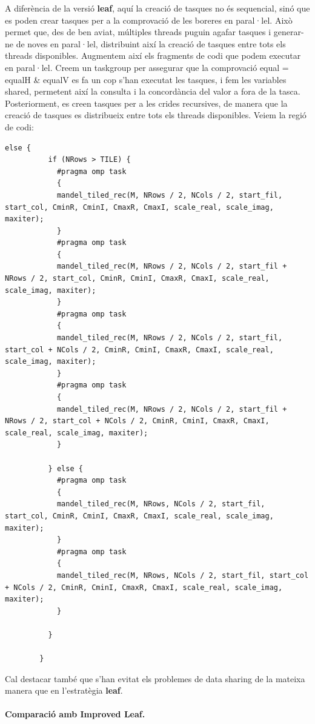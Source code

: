 A diferència de la versió \textbf{leaf}, aquí la creació de tasques no és sequencial, sinó que es poden crear tasques per a la comprovació de les boreres en paral·lel. Això permet que, des de ben aviat, múltiples threads puguin agafar tasques i generar-ne de noves en paral·lel, distribuint així la creació de tasques entre tots els threads disponibles. Augmentem així els fragments de codi que podem executar en paral·lel. Creem un taskgroup per assegurar que la comprovació equal = equalH \& equalV es fa un cop s'han executat les tasques, i fem les variables shared, permetent així la consulta i la concordància del valor a fora de la tasca.\\
Posteriorment, es creen tasques per a les crides recursives, de manera que la creació de tasques es distribueix entre tots els threads disponibles. Veiem la regió de codi:\\
\begin{lstlisting}[caption={Creació de tasques per a les crides recursives.},label={lst:rec-tree-tasks2}]
    else {
		  if (NRows > TILE) {
			#pragma omp task
			{
			mandel_tiled_rec(M, NRows / 2, NCols / 2, start_fil, start_col, CminR, CminI, CmaxR, CmaxI, scale_real, scale_imag, maxiter);
			}
			#pragma omp task
			{
			mandel_tiled_rec(M, NRows / 2, NCols / 2, start_fil + NRows / 2, start_col, CminR, CminI, CmaxR, CmaxI, scale_real, scale_imag, maxiter);
			}
			#pragma omp task
			{
			mandel_tiled_rec(M, NRows / 2, NCols / 2, start_fil, start_col + NCols / 2, CminR, CminI, CmaxR, CmaxI, scale_real, scale_imag, maxiter);
			}
			#pragma omp task
			{
			mandel_tiled_rec(M, NRows / 2, NCols / 2, start_fil + NRows / 2, start_col + NCols / 2, CminR, CminI, CmaxR, CmaxI, scale_real, scale_imag, maxiter);
			}

		  } else {
			#pragma omp task
			{
			mandel_tiled_rec(M, NRows, NCols / 2, start_fil, start_col, CminR, CminI, CmaxR, CmaxI, scale_real, scale_imag, maxiter);
			}
			#pragma omp task
			{
			mandel_tiled_rec(M, NRows, NCols / 2, start_fil, start_col + NCols / 2, CminR, CminI, CmaxR, CmaxI, scale_real, scale_imag, maxiter);
			}

		  }

	    }
\end{lstlisting}
Cal destacar també que s'han evitat els problemes de data sharing de la mateixa manera que en l'estratègia \textbf{leaf}.

\paragraph{Comparació amb Improved Leaf.}

